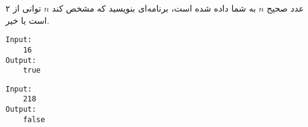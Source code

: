 \documentclass[../main.tex]{subfiles}
\begin{document}

عدد صحیح $n$ به شما داده شده است، برنامه‌ای بنویسید که مشخص کند $n$ توانی از ۲ است یا خیر.

\begin{latin}
\begin{verbatim}
Input:
    16
Output:
    true
\end{verbatim}
\end{latin}

\begin{latin}
\begin{verbatim}
Input:
    218
Output:
    false
\end{verbatim}
\end{latin}
\end{document}
